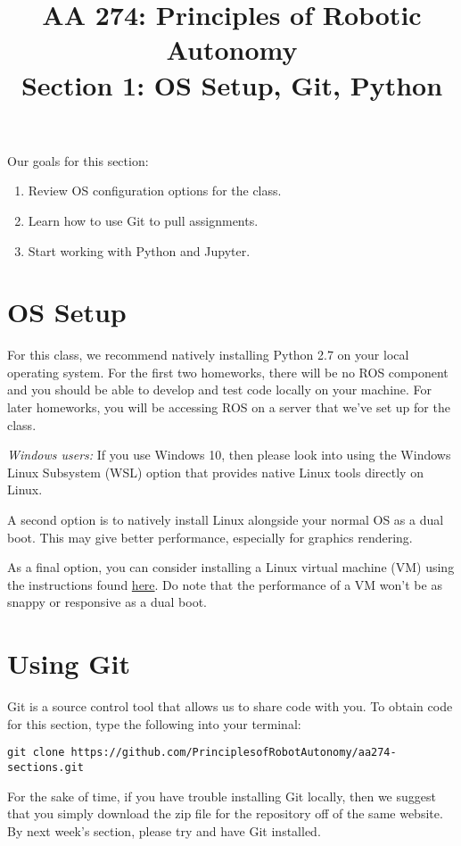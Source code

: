 \documentclass{article}
\title{AA 274: Principles of Robotic Autonomy \\ Section 1: OS Setup, Git, Python}
\date{}
\begin{document}
\maketitle
\pagestyle{fancy}

Our goals for this section: \begin{enumerate}
    \item Review OS configuration options for the class.
    \item Learn how to use Git to pull assignments.
    \item Start working with Python and Jupyter.
\end{enumerate}

\section{OS Setup}
For this class, we recommend natively installing Python 2.7 on your local operating system. For the first two homeworks, there will be no ROS component and you should be able to develop and test code locally on your machine. For later homeworks, you will be accessing ROS on a server that we've set up for the class.

\emph{Windows users: }If you use Windows 10, then please look into using the Windows Linux Subsystem (WSL) option that provides native Linux tools directly on Linux. 

A second option is to natively install Linux alongside your normal OS as a dual boot. This may give better performance, especially for graphics rendering. %

As a final option, you can consider installing a Linux virtual machine (VM) using the instructions found  \href{https://docs.google.com/document/d/1ley_pauriyx0PrH8XYfkIrZwXnL3s-xBQvcUY6RE02I/edit#}{here}. Do note that the performance of a VM won't be as snappy or responsive as a dual boot.

\section{Using Git}
Git is a source control tool that allows us to share code with you. To obtain code for this section, type the following into your terminal:

 \begin{lstlisting}[escapechar=|]
 git clone https://github.com/PrinciplesofRobotAutonomy/aa274-sections.git
\end{lstlisting}
For the sake of time, if you have trouble installing Git locally, then we suggest that you simply download the zip file for the repository off of the same website. By next week's section, please try and have Git installed.
\end{document}
